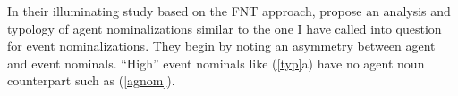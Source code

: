 \documentclass[output=paper,
modfonts
]{LSP/langsci}
\newcommand{\rf}[1]{(\ref{#1})}
\newcommand{\rfa}[2]{(\ref{#1}{#2})}
\begin{document}
In their illuminating study based on the FNT approach, \citet{baker2009} propose an analysis
and typology of agent nominalizations similar to the one I have called into question for event
nominalizations.  They begin by noting an asymmetry between agent and event nominals.  ``High''
event nominals like \rfa{typ}{a} have no agent noun counterpart such as \rf{agnom}.
\begin{exe}
\label{agnom}
\end{exe}
\end{document}
